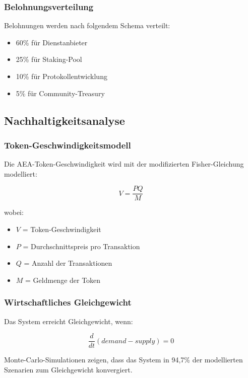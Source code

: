 \documentclass[12pt,a4paper]{article}
\begin{document}
\subsubsection{Belohnungsverteilung}

Belohnungen werden nach folgendem Schema verteilt:
\begin{itemize}
\item 60\% für Dienstanbieter
\item 25\% für Staking-Pool
\item 10\% für Protokollentwicklung
\item 5\% für Community-Treasury
\end{itemize}

\subsection{Nachhaltigkeitsanalyse}

\subsubsection{Token-Geschwindigkeitsmodell}

Die AEA-Token-Geschwindigkeit wird mit der modifizierten Fisher-Gleichung modelliert:

\begin{equation}
V = \frac{PQ}{M}
\end{equation}

wobei:
\begin{itemize}
\item $V$ = Token-Geschwindigkeit
\item $P$ = Durchschnittspreis pro Transaktion
\item $Q$ = Anzahl der Transaktionen
\item $M$ = Geldmenge der Token
\end{itemize}

\subsubsection{Wirtschaftliches Gleichgewicht}

Das System erreicht Gleichgewicht, wenn:

\begin{equation}
\frac{d}{dt}(demand - supply) = 0
\end{equation}

Monte-Carlo-Simulationen zeigen, dass das System in 94,7\% der modellierten Szenarien zum Gleichgewicht konvergiert.
\end{document}
